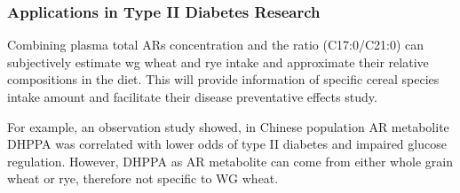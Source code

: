 %			

\subsubsection{Applications in Type II Diabetes Research}
Combining plasma total ARs concentration and the ratio (C17:0/C21:0) can subjectively estimate \acrshort{wg} wheat and rye intake and approximate their relative compositions in the diet. This will provide information of specific cereal species intake amount and facilitate their disease preventative effects study.

For example, an observation study showed, in Chinese population AR metabolite DHPPA was correlated with lower odds of type II diabetes and impaired glucose regulation\cite{ISI:000430455900021}. However, DHPPA as AR metabolite can come from either whole grain wheat or rye, therefore not specific to WG wheat.

